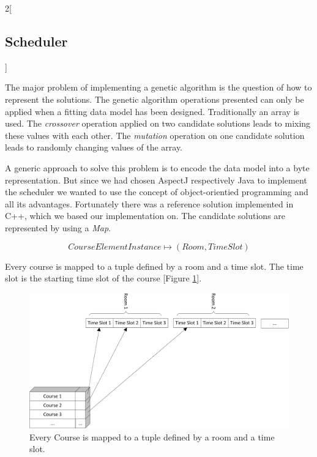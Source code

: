 \begin{multicols}{2}[\subsection{Scheduler}]

The major problem of implementing a genetic algorithm is the question of how to represent the solutions. The genetic algorithm operations presented can only be applied when a fitting data model has been designed. Traditionally an array is used. The \emph{crossover} operation applied on two candidate solutions leads to mixing these values with each other. The \emph{mutation} operation on one candidate solution leads to randomly changing values of the array.

A generic approach to solve this problem is to encode the data model into a byte representation. But since we had chosen AspectJ respectively Java to implement the scheduler we wanted to use the concept of object-orientied programming and all its advantages. Fortunately there was a reference solution implemented in C++, which we based our implementation on. The candidate solutions are represented by using a \emph{Map}.

\[CourseElementInstance \mapsto (Room,Time Slot)\]

Every course is mapped to a tuple defined by a room and a time slot. The time slot is the starting time slot of the course [Figure \ref{fig:map}].

\raggedcolumns
\columnbreak

\begin{figure}[H]
\includegraphics[width=\columnwidth]{images/map.png}%
\caption{Every Course is mapped to a tuple defined by a room and a time slot.}%
\label{fig:map}%
\end{figure}


\end{multicols}
